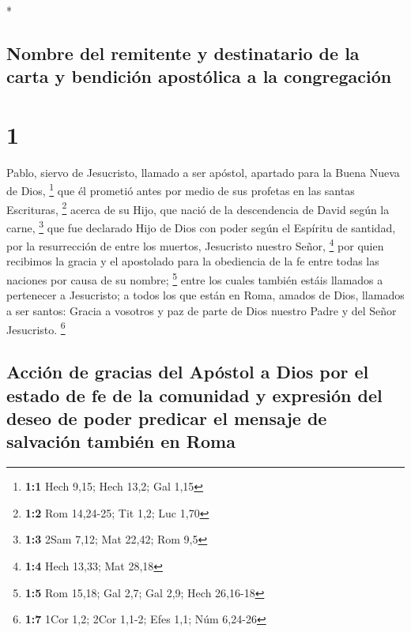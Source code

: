 \begin{paracol}{2} \switchcolumn[0]*

\hypertarget{nombre-del-remitente-y-destinatario-de-la-carta-y-bendiciuxf3n-apostuxf3lica-a-la-congregaciuxf3n}{%
\subsection{Nombre del remitente y destinatario de la carta y bendición
apostólica a la
congregación}\label{nombre-del-remitente-y-destinatario-de-la-carta-y-bendiciuxf3n-apostuxf3lica-a-la-congregaciuxf3n}}

\hypertarget{section}{%
\section{1}\label{section}}

 Pablo, siervo de Jesucristo, llamado a ser apóstol,
apartado para la Buena Nueva de Dios, \footnote{\textbf{1:1} Hech 9,15;
  Hech 13,2; Gal 1,15}  que él prometió antes por medio de
sus profetas en las santas Escrituras, \footnote{\textbf{1:2} Rom
  14,24-25; Tit 1,2; Luc 1,70}  acerca de su Hijo, que
nació de la descendencia de David según la carne, \footnote{\textbf{1:3}
  2Sam 7,12; Mat 22,42; Rom 9,5}  que fue declarado Hijo
de Dios con poder según el Espíritu de santidad, por la resurrección de
entre los muertos, Jesucristo nuestro Señor, \footnote{\textbf{1:4} Hech
  13,33; Mat 28,18}  por quien recibimos la gracia y el
apostolado para la obediencia de la fe entre todas las naciones por
causa de su nombre; \footnote{\textbf{1:5} Rom 15,18; Gal 2,7; Gal 2,9;
  Hech 26,16-18}  entre los cuales también estáis llamados
a pertenecer a Jesucristo;  a todos los que están en Roma,
amados de Dios, llamados a ser santos: Gracia a vosotros y paz de parte
de Dios nuestro Padre y del Señor Jesucristo. \footnote{\textbf{1:7}
  1Cor 1,2; 2Cor 1,1-2; Efes 1,1; Núm 6,24-26}

\hypertarget{acciuxf3n-de-gracias-del-apuxf3stol-a-dios-por-el-estado-de-fe-de-la-comunidad-y-expresiuxf3n-del-deseo-de-poder-predicar-el-mensaje-de-salvaciuxf3n-tambiuxe9n-en-roma}{%
\subsection{Acción de gracias del Apóstol a Dios por el estado de fe de
la comunidad y expresión del deseo de poder predicar el mensaje de
salvación también en
Roma}\label{acciuxf3n-de-gracias-del-apuxf3stol-a-dios-por-el-estado-de-fe-de-la-comunidad-y-expresiuxf3n-del-deseo-de-poder-predicar-el-mensaje-de-salvaciuxf3n-tambiuxe9n-en-roma}}


\end{paracol}
